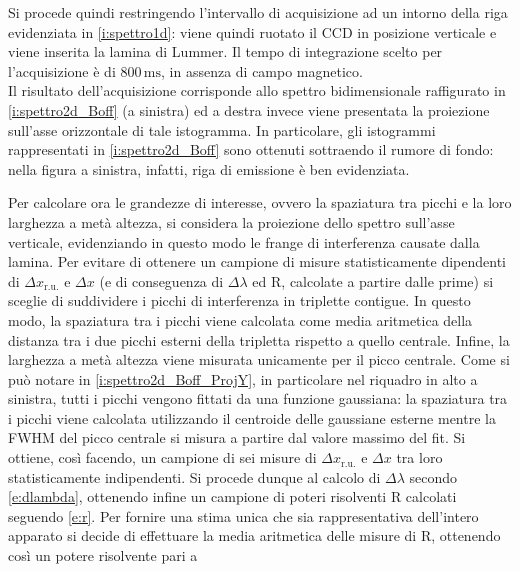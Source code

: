 \documentclass[twocolumn,10pt]{asme2ej}
\begin{document}
Si procede quindi restringendo l'intervallo di acquisizione ad un intorno della riga evidenziata in
\autoref{i:spettro1d}: viene quindi ruotato il CCD in posizione verticale e viene inserita la lamina di Lummer. Il tempo
di integrazione scelto per l'acquisizione è di $800\,\si{\milli\second}$, in assenza di campo magnetico. \\
Il risultato dell'acquisizione corrisponde allo spettro bidimensionale raffigurato in \autoref{i:spettro2d_Boff} (a
sinistra) ed a destra invece viene presentata la proiezione sull'asse orizzontale di tale istogramma. In particolare,
gli istogrammi rappresentati in \autoref{i:spettro2d_Boff} sono ottenuti sottraendo il rumore di fondo: nella figura a
sinistra, infatti, riga di emissione è ben evidenziata. 



Per calcolare ora le grandezze di interesse, ovvero la spaziatura tra picchi e la loro larghezza a metà altezza, si
considera la proiezione dello spettro sull'asse verticale, evidenziando in questo modo le frange di interferenza causate
dalla lamina. Per evitare di ottenere un campione di misure statisticamente dipendenti di $\Delta x_{\text{r.u.}}$ e
$\Delta x$ (e di conseguenza di $\Delta\lambda$ ed R, calcolate a partire dalle prime) si sceglie di suddividere i
picchi di interferenza in triplette contigue. In questo modo, la spaziatura tra i picchi viene calcolata come media
aritmetica della distanza tra i due picchi esterni della tripletta rispetto a quello centrale. Infine, la larghezza a
metà altezza viene misurata unicamente per il picco centrale. Come si può notare in \autoref{i:spettro2d_Boff_ProjY}, in
particolare nel riquadro in alto a sinistra, tutti i picchi vengono fittati da una funzione gaussiana: la spaziatura tra
i picchi viene calcolata utilizzando il centroide delle gaussiane esterne mentre la FWHM del picco centrale si misura a
partire dal valore massimo del fit. Si ottiene, così facendo, un campione di sei misure di $\Delta x_{\text{r.u.}}$ e
$\Delta x$ tra loro statisticamente indipendenti. Si procede dunque al calcolo di $\Delta\lambda$ secondo
\autoref{e:dlambda}, ottenendo infine un campione di poteri risolventi R calcolati seguendo \autoref{e:r}. Per fornire
una stima unica che sia rappresentativa dell'intero apparato si decide di effettuare la media aritmetica delle misure di
R, ottenendo così un potere risolvente pari a 
\end{document}
